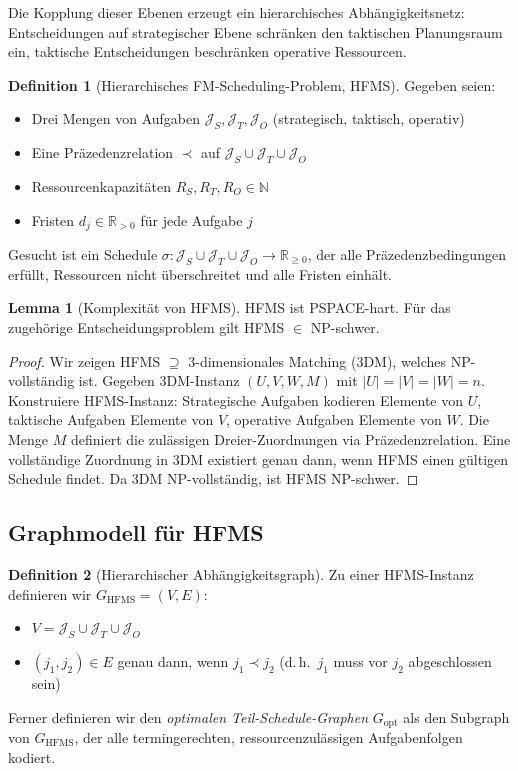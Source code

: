 ﻿\documentclass[a4paper,12pt]{article}
\theoremstyle{definition}
\newtheorem{definition}{Definition}[section]
\newtheorem{lemma}{Lemma}[section]
\begin{document}
Die Kopplung dieser Ebenen erzeugt ein hierarchisches Abhängigkeitsnetz:
Entscheidungen auf strategischer Ebene schränken den taktischen Planungsraum ein,
taktische Entscheidungen beschränken operative Ressourcen.

\begin{definition}[Hierarchisches FM-Scheduling-Problem, HFMS]
\label{def:hfms}
Gegeben seien:
\begin{itemize}
    \item Drei Mengen von Aufgaben $\mathcal{J}_S, \mathcal{J}_T, \mathcal{J}_O$
          (strategisch, taktisch, operativ)
    \item Eine Präzedenzrelation $\prec$ auf $\mathcal{J}_S \cup \mathcal{J}_T \cup \mathcal{J}_O$
    \item Ressourcenkapazitäten $R_S, R_T, R_O \in \mathbb{N}$
    \item Fristen $d_j \in \mathbb{R}_{>0}$ für jede Aufgabe $j$
\end{itemize}
Gesucht ist ein Schedule $\sigma: \mathcal{J}_S \cup \mathcal{J}_T \cup \mathcal{J}_O \to \mathbb{R}_{\geq 0}$,
der alle Präzedenzbedingungen erfüllt, Ressourcen nicht überschreitet und alle Fristen einhält.
\end{definition}

\begin{lemma}[Komplexität von HFMS]
\label{lem:hfms-np}
HFMS ist PSPACE-hart. Für das zugehörige Entscheidungsproblem gilt HFMS $\in$ NP-schwer.
\end{lemma}

\begin{proof}
Wir zeigen HFMS $\supseteq$ 3-dimensionales Matching (3DM), welches NP-vollständig ist.
Gegeben 3DM-Instanz $(U, V, W, M)$ mit $|U| = |V| = |W| = n$.
Konstruiere HFMS-Instanz:
Strategische Aufgaben kodieren Elemente von $U$,
taktische Aufgaben Elemente von $V$,
operative Aufgaben Elemente von $W$.
Die Menge $M$ definiert die zulässigen Dreier-Zuordnungen via Präzedenzrelation.
Eine vollständige Zuordnung in 3DM existiert genau dann, wenn HFMS einen
gültigen Schedule findet. Da 3DM NP-vollständig, ist HFMS NP-schwer.
\end{proof}

\subsection{Graphmodell für HFMS}

\begin{definition}[Hierarchischer Abhängigkeitsgraph]
\label{def:hag}
Zu einer HFMS-Instanz definieren wir $G_{\mathrm{HFMS}} = (V, E)$:
\begin{itemize}
    \item $V = \mathcal{J}_S \cup \mathcal{J}_T \cup \mathcal{J}_O$
    \item $(j_1, j_2) \in E$ genau dann, wenn $j_1 \prec j_2$
          (d.\,h.\ $j_1$ muss vor $j_2$ abgeschlossen sein)
\end{itemize}
Ferner definieren wir den \emph{optimalen Teil-Schedule-Graphen} $G_{\mathrm{opt}}$
als den Subgraph von $G_{\mathrm{HFMS}}$, der alle termingerechten, ressourcenzulässigen
Aufgabenfolgen kodiert.
\end{definition}
\end{document}
